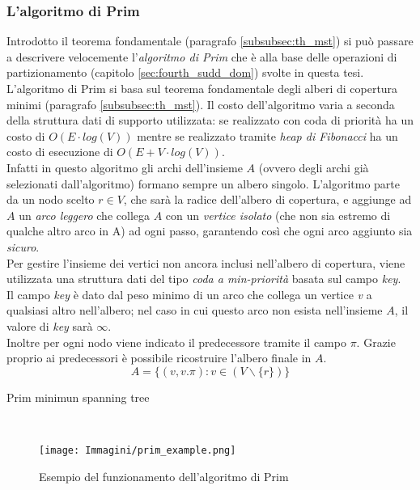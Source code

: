 \subsubsection{L'algoritmo di Prim}
Introdotto il teorema fondamentale (paragrafo \ref{subsubsec:th_mst}) si può passare a descrivere velocemente l'\emph{algoritmo di Prim} che è alla base delle operazioni di partizionamento (capitolo \ref{sec:fourth_sudd_dom}) svolte in questa tesi.\\
L’algoritmo di Prim si basa sul teorema fondamentale degli alberi di copertura minimi (paragrafo \ref{subsubsec:th_mst}). Il costo dell'algoritmo varia a seconda della struttura dati di supporto utilizzata: se realizzato con coda di priorità ha un costo di $O(E\cdot log(V))$ mentre se realizzato tramite \textit{heap di Fibonacci} ha un costo di esecuzione di $O(E+V\cdot log(V))$.\\
Infatti in questo algoritmo gli archi dell'insieme $A$ (ovvero degli archi già selezionati dall'algoritmo) formano sempre un albero singolo. L’algoritmo parte da un nodo scelto $r \in V$, che sarà la radice dell’albero di copertura, e aggiunge ad $A$ un \textit{arco leggero} che collega $A$ con un \textit{vertice isolato} (che non sia estremo di qualche altro arco in A) ad ogni passo, garantendo così che ogni arco aggiunto sia \textit{sicuro}.\\
Per gestire l’insieme dei vertici non ancora inclusi nell’albero di copertura, viene utilizzata una struttura dati del tipo \textit{coda a min-priorità} basata sul campo \textit{key}.\\
Il campo \textit{key} è dato dal peso minimo di un arco che collega un vertice \textit{v} a qualsiasi altro nell'albero; nel caso in cui questo arco non esista nell'insieme $A$, il valore di \textit{key} sarà $\infty$.\\
Inoltre per ogni nodo viene indicato il predecessore tramite il campo $\pi$. Grazie proprio ai predecessori è possibile ricostruire l'albero finale in $A$.
\begin{equation}
	A = \{(v, v.\pi) : v \in (V \backslash \{r\})\}
\end{equation}

\begin{algorithm}[H]
	\caption{Prim minimun spanning tree}
	\label{alg:Prim_Mst}
	\begin{algorithmic}[1]
		\Statex
		\\
		\EndFor
		\EndIf
		\EndFor
		\EndWhile
		\State \Return{}
		\EndFunction
	\end{algorithmic}
\end{algorithm}

\begin{figure}[H]
	\centering
	\texttt{[image: Immagini/prim\_example.png]}
	\caption{Esempio del funzionamento dell'algoritmo di Prim}
	\label{fig:prim_alg}
\end{figure}

